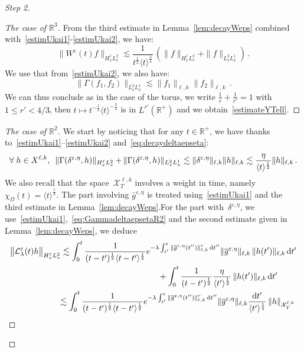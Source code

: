 \documentclass[11pt]{article}
\theoremstyle{definition}
\numberwithin{equation}{section}
\numberwithin{figure}{section}
\numberwithin{table}{section}
\newcommand*{\dd}{\mathrm{d}}
\newcommand*{\dt}{\dd t}
\newenvironment{step}[1]{\begin{proof}[#1]}{\let\qed\relax\end{proof}}
\newcommand*\R {\mathbb{R}}
\newcommand*\eps{{\varepsilon}}
\newcommand*\e{{\varepsilon}}
\newcommand*{\mk}{\mkern -1mu}
\let\oldforall\forall
\renewcommand*{\forall}{\mathrel{\oldforall}}
\begin{document}
\begin{step}{Step 2}
\begin{step}{The case of $\R^3$}
From the third estimate in Lemma~\ref{lem:decayWeps} combined with~\eqref{estimUkai1}-\eqref{estimUkai2}, we have:
\[
\|W^\e(t) f\|_{H^\ell_xL^2_v} \lesssim \frac{1}{{t^\frac12\langle t \rangle^{\frac 34}}} \, \left(\|f\|_{H^\ell_xL^2_v} +\|f\|_{L^2_vL^1_x}\right)\,.
\]
We use that from~\eqref{estimUkai2}, we also have:
\[
\|\Gamma(f_1,f_2)\|_{{L^2_vL^1_x}}\lesssim \| f_1 \|_{{\ell,k}} \| f_2\|_{{\ell,k}} \,.
\]
We can thus conclude as in the case of the torus, we write $ \frac1r+\frac1{r'} = 1$ with $1\leq r'<4/3$, then $t \mapsto t^{-\frac12} \langle t \rangle^{-\frac 34}$ is in $L^{r'}(\R^+)$ and we obtain~\eqref{estimateYTell}.
\end{step}

\begin{step}{The case of $\R^2$}
We start by noticing that for any $t \in \R^+$, we have thanks to~\eqref{estimUkai1}--\eqref{estimUkai2} and~\eqref{eq:decaydeltaepseta}:
\begin{equation}\label{eq:GammadeltaepsetaR2}
\!\forall h \in X^{\ell,k},\;\:
\|\Gamma(\delta^{\eps,\eta},h)\|_{H^\ell_xL^2_v} \mk+\mk \|\Gamma(\delta^{\eps,\eta},h)\|_{L^2_vL^1_x}
\lesssim \|\delta^{\eps,\eta}\|_{\ell,k} \|h\|_{\ell,k}\lesssim \frac{\eta}{\langle t \rangle^{\frac12}} \|h\|_{\ell,k} \,.\!
\end{equation}
We also recall that the space~$\mathcal{X}_T^{\ell,k}$ involves a weight in time, namely~$\chi_\Omega(t)= \langle t \rangle^\frac14$. The part involving $\bar g^{\eps,\eta}$ is treated using~\eqref{estimUkai1} and the third estimate in Lemma~\ref{lem:decayWeps}.\linebreak For the part with~$\delta^{\eps,\eta}$, we use~\eqref{estimUkai1},~\eqref{eq:GammadeltaepsetaR2} and the second estimate given in Lemma~\ref{lem:decayWeps}, we deduce
\begin{align*}
& \big \| \mathcal{L}_\lambda^{\e}(t) h\big\|_{H^\ell_xL^2_v} \lesssim \int_0^t \frac{1}{(t-t')^\frac12\langle t-t' \rangle^\frac12} e^{- \lambda \int_{t'}^t \|\overline g^{\eps,\eta}(t'')\|_{\ell,k}^r\, \dt''}
\|\overline g^{\eps,\eta}\|_{\ell,k} \, \|h(t')\|_{\ell,k} \, \dt' \\
&\mkern 323mu + \int_0^t \frac{1}{(t-t')^\frac12} \frac{\eta}{\langle t' \rangle^{\frac12}} \, \|h(t')\|_{\ell,k} \, \dt'\\
&\mkern 105mu \lesssim \int_0^t \frac{1}{(t-t')^\frac12\langle t-t' \rangle^\frac12} e^{- \lambda \int_{t'}^t \|\overline g^{\eps,\eta}(t'')\|_{\ell,k}^r\, \dt''} \|\overline g^{\eps,\eta}\|_{\ell,k} \frac{\dt'}{{\langle t' \rangle^{\frac14}}} \, \|h\|_{\mathcal{X}_T^{\ell,k}} \\

\end{align*}
\end{step}
\end{step}
\end{document}
